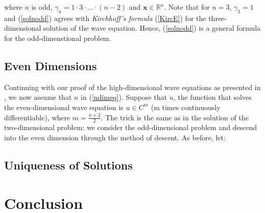 \documentclass[a4paper, 12pt]{article}
\numberwithin{equation}{section}
\begin{document}
where $n$ is odd, $\gamma_n=1 \cdot 3 \cdot ... \cdot (n-2)$ and $\boldsymbol{x}\in \mathbb{R}^n$. Note that for $n=3$, $\gamma_3 = 1$ and (\ref{solnodd}) agrees with 
\emph{Kirchhoff's formula} (\ref{KircE}) for the three-dimensional solution of the wave equation. Hence, (\ref{solnodd}) is a general formula for the odd-dimenstional problem.

\subsection{Even Dimensions}
Continuing with our proof of the high-dimensional wave equations as presented in \cite{Ev}, we now assume that $n$ in (\ref{ndimeq}). Suppose that $u$, the function that 
solves the even-dimensional wave equation is $u \in C^m$ (m times continuously differentiable), where $m=\frac{n+2}{2}$. The trick is the same as in the solution of the 
two-dimensional problem: we consider the odd-dimensional problem and descend into the even dimension through the method of descent. As before, let:

 

\subsection{Uniqueness of Solutions}

\section{Conclusion}

\newpage 



\end{document}
